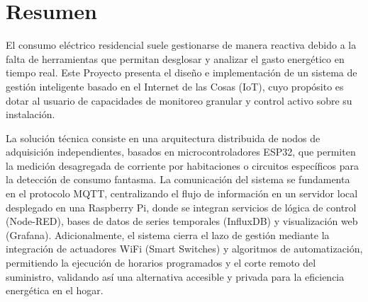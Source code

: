\setcounter{page}{1} %
\pagestyle{fancy}

\section{Resumen}

El consumo eléctrico residencial suele gestionarse de manera reactiva debido a la falta de herramientas que permitan desglosar y analizar el gasto energético en tiempo real. Este Proyecto presenta el diseño e implementación de un sistema de gestión inteligente basado en el Internet de las Cosas (IoT), cuyo propósito es dotar al usuario de capacidades de monitoreo granular y control activo sobre su instalación.

La solución técnica consiste en una arquitectura distribuida de nodos de adquisición independientes, basados en microcontroladores ESP32, que permiten la medición desagregada de corriente por habitaciones o circuitos específicos para la detección de consumo fantasma. La comunicación del sistema se fundamenta en el protocolo MQTT, centralizando el flujo de información en un servidor local desplegado en una Raspberry Pi, donde se integran servicios de lógica de control (Node-RED), bases de datos de series temporales (InfluxDB) y visualización web (Grafana). Adicionalmente, el sistema cierra el lazo de gestión mediante la integración de actuadores WiFi (Smart Switches) y algoritmos de automatización, permitiendo la ejecución de horarios programados y el corte remoto del suministro, validando así una alternativa accesible y privada para la eficiencia energética en el hogar.
\newpage

